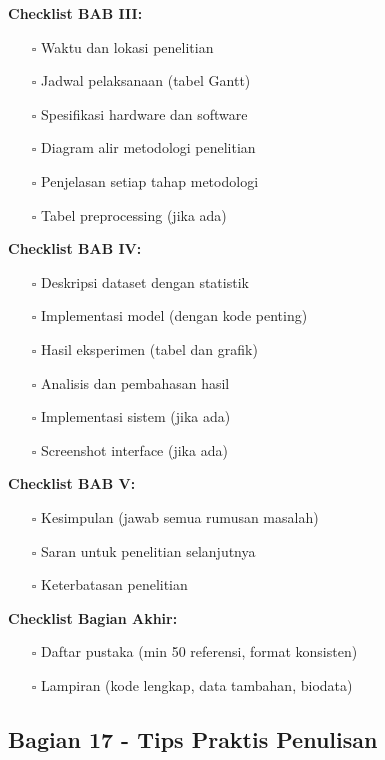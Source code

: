 \textbf{Checklist BAB III:}
\begin{enumerate}
    \item[$\square$] Waktu dan lokasi penelitian
    \item[$\square$] Jadwal pelaksanaan (tabel Gantt)
    \item[$\square$] Spesifikasi hardware dan software
    \item[$\square$] Diagram alir metodologi penelitian
    \item[$\square$] Penjelasan setiap tahap metodologi
    \item[$\square$] Tabel preprocessing (jika ada)
\end{enumerate}

\textbf{Checklist BAB IV:}
\begin{enumerate}
    \item[$\square$] Deskripsi dataset dengan statistik
    \item[$\square$] Implementasi model (dengan kode penting)
    \item[$\square$] Hasil eksperimen (tabel dan grafik)
    \item[$\square$] Analisis dan pembahasan hasil
    \item[$\square$] Implementasi sistem (jika ada)
    \item[$\square$] Screenshot interface (jika ada)
\end{enumerate}

\textbf{Checklist BAB V:}
\begin{enumerate}
    \item[$\square$] Kesimpulan (jawab semua rumusan masalah)
    \item[$\square$] Saran untuk penelitian selanjutnya
    \item[$\square$] Keterbatasan penelitian
\end{enumerate}

\textbf{Checklist Bagian Akhir:}
\begin{enumerate}
    \item[$\square$] Daftar pustaka (min 50 referensi, format konsisten)
    \item[$\square$] Lampiran (kode lengkap, data tambahan, biodata)
\end{enumerate}

\subsection*{Bagian 17 - Tips Praktis Penulisan}

